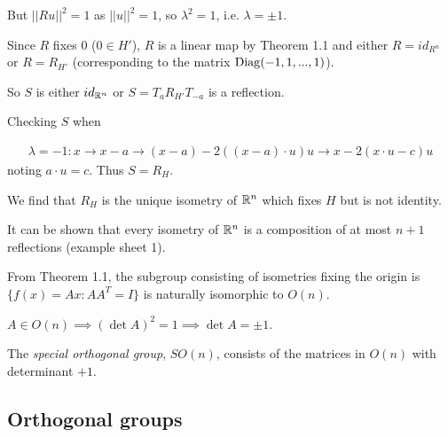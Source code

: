 \documentclass[a4paper]{article}
\begin{document}
\begin{eg}
But $||Ru||^2 = 1$ as $||u||^2=1$, so $\lambda^2 = 1$, i.e. $\lambda = \pm 1$.

Since $R$ fixes $0$ ($0 \in H'$), $R$ is a linear map by Theorem 1.1 and either $R = id_{R^n}$ or $R=R_{H'}$ (corresponding to the matrix $\operatorname{Diag}(-1,1,...,1)$).

So $S$ is either $id_{\mathbb{R}^n}$ or $S=T_a R_{H'} T_{-a}$ is a reflection.

Checking $S$ when 

\begin{equation*}
\begin{aligned}
\lambda = -1: x \to x-a \to (x-a) - 2 ((x-a) \cdot u) u \to x - 2(x \cdot u - c) u
\end{aligned}
\end{equation*}
noting $a \cdot u = c$. Thus $S =R_H$.
\end{eg}

We find that $R_H$ is the unique isometry of $\mathbb{R}^n$ which fixes $H$ but is not identity.

It can be shown that every isometry of $\mathbb{R}^n$ is a composition of at most $n+1$ reflections (example sheet 1).

From Theorem 1.1, the subgroup consisting of isometries fixing the origin is $\{f(x)=Ax : AA^T = I\}$ is naturally isomorphic to $O(n)$.

$A \in O(n) \implies (\det A)^2 = 1 \implies \det A = \pm 1$.

\begin{defi}
The \emph{special orthogonal group}, $SO(n)$, consists of the matrices in $O(n)$ with determinant $+1$.
\end{defi}

\subsection{Orthogonal groups}
\end{document}
